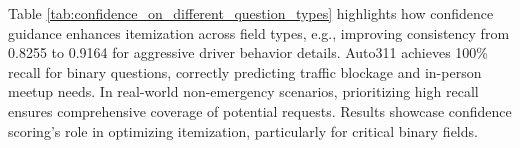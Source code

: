 
Table \ref{tab:confidence_on_different_question_types} highlights how confidence guidance enhances itemization across field types, e.g., improving consistency from 0.8255 to 0.9164 for aggressive driver behavior details. Auto311 achieves 100\% recall for binary questions, correctly predicting traffic blockage and in-person meetup needs. In real-world non-emergency scenarios, prioritizing high recall ensures comprehensive coverage of potential requests. Results showcase confidence scoring's role in optimizing itemization, particularly for critical binary fields.



